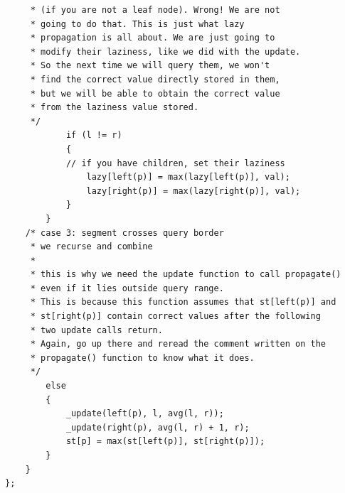 \documentclass[12pt]{book}
\begin{document}
\begin{verbatim}
	 * (if you are not a leaf node). Wrong! We are not
	 * going to do that. This is just what lazy
	 * propagation is all about. We are just going to
	 * modify their laziness, like we did with the update.
	 * So the next time we will query them, we won't
	 * find the correct value directly stored in them,
	 * but we will be able to obtain the correct value
	 * from the laziness value stored.
	 */
			if (l != r)
			{
			// if you have children, set their laziness
				lazy[left(p)] = max(lazy[left(p)], val);
				lazy[right(p)] = max(lazy[right(p)], val);
			}
		}
	/* case 3: segment crosses query border
	 * we recurse and combine
	 *
	 * this is why we need the update function to call propagate()
	 * even if it lies outside query range.
	 * This is because this function assumes that st[left(p)] and
	 * st[right(p)] contain correct values after the following
	 * two update calls return.
	 * Again, go up there and reread the comment written on the
	 * propagate() function to know what it does.
	 */
		else
		{
			_update(left(p), l, avg(l, r));
			_update(right(p), avg(l, r) + 1, r);
			st[p] = max(st[left(p)], st[right(p)]);
		}
	}
};
\end{verbatim}
\end{document}
